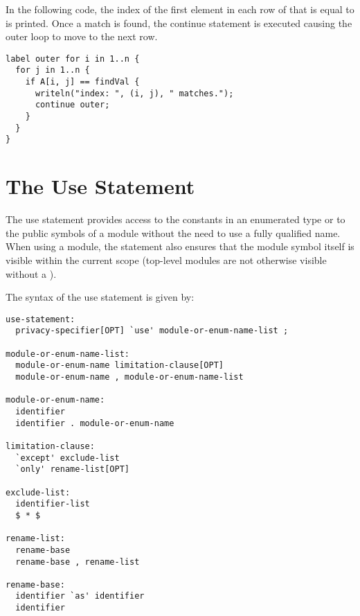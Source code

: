 \begin{example}
In the following code, the index of the first element in each row of
 that is equal to  is printed.  Once a match is
found, the continue statement is executed causing the outer loop to
move to the next row.
\begin{chapel}
\begin{verbatim}
label outer for i in 1..n {
  for j in 1..n {
    if A[i, j] == findVal {
      writeln("index: ", (i, j), " matches.");
      continue outer;
    }
  }
}
\end{verbatim}
\end{chapel}
\end{example}

\section{The Use Statement}
\label{The_Use_Statement}

The use statement provides access to the constants in an enumerated
type or to the public symbols of a module without the need to use a
fully qualified name.  When using a module, the statement also ensures
that the module symbol itself is visible within the current scope
(top-level modules are not otherwise visible without a ).

The syntax of the use statement is given by:

\begin{syntax}
\begin{verbatim}
use-statement:
  privacy-specifier[OPT] `use' module-or-enum-name-list ;

module-or-enum-name-list:
  module-or-enum-name limitation-clause[OPT]
  module-or-enum-name , module-or-enum-name-list

module-or-enum-name:
  identifier
  identifier . module-or-enum-name

limitation-clause:
  `except' exclude-list
  `only' rename-list[OPT]

exclude-list:
  identifier-list
  $ * $

rename-list:
  rename-base
  rename-base , rename-list

rename-base:
  identifier `as' identifier
  identifier
\end{verbatim}
\end{syntax}

